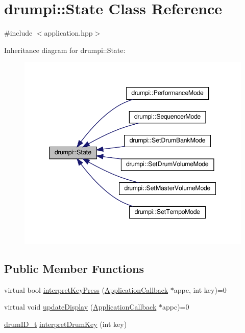 \hypertarget{classdrumpi_1_1State}{}\section{drumpi\+:\+:State Class Reference}
\label{classdrumpi_1_1State}


{\ttfamily \#include $<$application.\+hpp$>$}



Inheritance diagram for drumpi\+:\+:State\+:
\nopagebreak
\begin{figure}[H]
\begin{center}
\leavevmode
\includegraphics[width=345pt]{classdrumpi_1_1State__inherit__graph}
\end{center}
\end{figure}
\subsection*{Public Member Functions}
\begin{DoxyCompactItemize}
\item 
virtual bool \hyperlink{classdrumpi_1_1State_aaa6205d85513b3f717c126e0717e1dbd}{interpret\+Key\+Press} (\hyperlink{classdrumpi_1_1ApplicationCallback}{Application\+Callback} $\ast$appc, int key)=0
\item 
virtual void \hyperlink{classdrumpi_1_1State_a400c5fc605ddec1e4fe18c361bf38ef2}{update\+Display} (\hyperlink{classdrumpi_1_1ApplicationCallback}{Application\+Callback} $\ast$appc)=0
\item 
\hyperlink{namespacedrumpi_a3897274035c1b939a604438abe648b1b}{drum\+I\+D\+\_\+t} \hyperlink{classdrumpi_1_1State_a39b749a9049a4810935459c82aa42e6d}{interpret\+Drum\+Key} (int key)
\end{DoxyCompactItemize}
